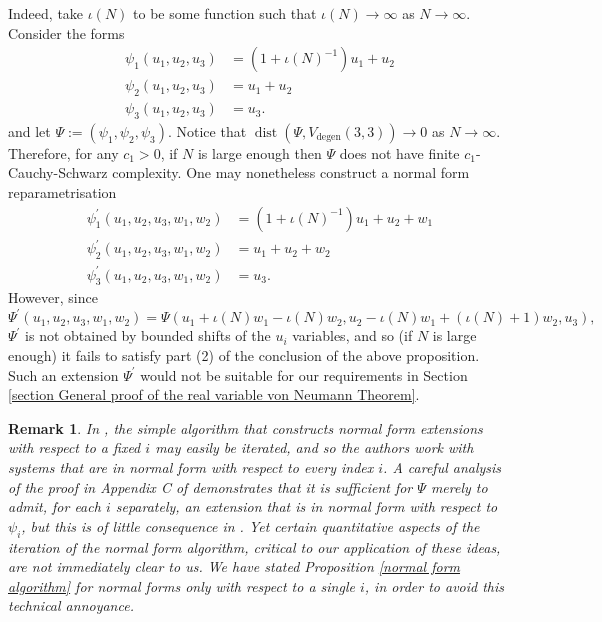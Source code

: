 \documentclass[12pt,a4paper,twoside,reqno]{amsart}
\newtheorem{Remark}[Theorem]{Remark}
\newcommand{\degen}{\operatorname{degen}}
\newcommand{\dist}{\operatorname{dist}}
\numberwithin{equation}{section}
\begin{document}
Indeed, take $\iota(N)$ to be some function such that $\iota(N)\rightarrow \infty$ as $N\rightarrow \infty$. Consider the forms
\begin{align*}
\psi_1(u_1,u_2,u_3) &= (1+\iota(N)^{-1})u_1 + u_2\\
\psi_2(u_1,u_2,u_3) &= u_1 + u_2\\
\psi_3(u_1,u_2,u_3) & = u_3.
\end{align*}
\noindent and let $\Psi := (\psi_1,\psi_2,\psi_3)$. Notice that $\dist(\Psi,V_{\degen}(3,3)) \rightarrow 0$ as $N\rightarrow \infty$. Therefore, for any $c_1 >0$, if $N$ is large enough then $\Psi$ does not have finite $c_1$-Cauchy-Schwarz complexity. One may nonetheless construct a normal form reparametrisation 
\begin{align*}
\psi^\prime_1(u_1,u_2,u_3,w_1,w_2)& = (1+\iota(N)^{-1})u_1 + u_2 + w_1\\
\psi^\prime_2(u_1,u_2,u_3,w_1,w_2)& =  u_1 + u_2 + w_2\\
\psi^\prime_3(u_1,u_2,u_3,w_1,w_2)& = u_3.
\end{align*}
\noindent However, since $$\Psi^\prime( u_1,u_2,u_3,w_1,w_2) = \Psi(u_1 + \iota(N)w_1- \iota(N)w_2, u_2 - \iota(N)w_1 + (\iota(N) + 1)w_2,u_3),$$ $\Psi^\prime$ is not obtained by bounded shifts of the $u_i$ variables, and so (if $N$ is large enough) it fails to satisfy part (2) of the conclusion of the above proposition. Such an extension $\Psi^\prime$ would not be suitable for our requirements in Section \ref{section General proof of the real variable von Neumann Theorem}. 

\begin{Remark}
\emph{In \cite{GT10}, the simple algorithm that constructs normal form extensions with respect to a fixed $i$ may easily be iterated, and so the authors work with systems that are in normal form with respect to every index $i$. A careful analysis of the proof in Appendix C of \cite{GT10} demonstrates that it is sufficient for $\Psi$ merely to admit, for each $i$ separately, an extension that is in normal form with respect to $\psi_i$, but this is of little consequence in \cite{GT10}. Yet certain quantitative aspects of the iteration of the normal form algorithm, critical to our application of these ideas, are not immediately clear to us. We have stated Proposition \ref{normal form algorithm} for normal forms only with respect to a single $i$, in order to avoid this technical annoyance.} \\
\end{Remark}
\end{document}
